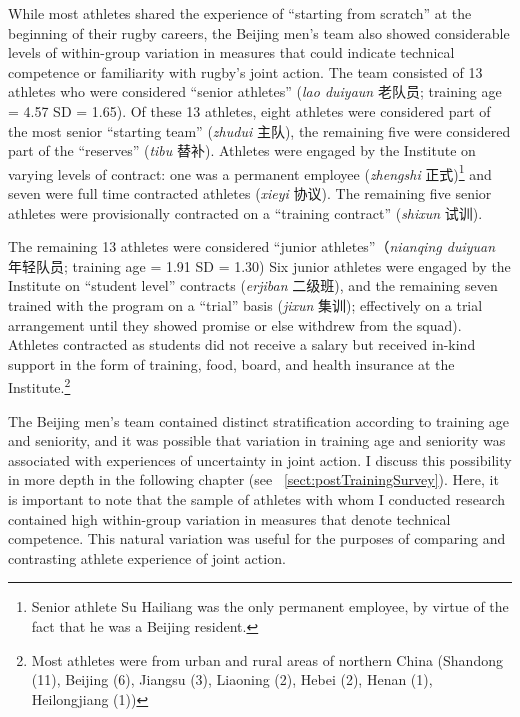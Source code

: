 \begin{CJK}{UTF8}{gbsn}
While most athletes shared the experience of ``starting from scratch'' at the beginning of their rugby careers, the Beijing men's team also showed considerable levels of within-group variation in measures that could indicate technical competence or familiarity with rugby's joint action.  The team consisted of 13 athletes who were considered ``senior athletes'' (\textit{lao duiyaun} 老队员; training age = 4.57 SD = 1.65).  Of these 13 athletes, eight athletes were considered part of the most senior ``starting team'' (\textit{zhudui} 主队), the remaining five were considered part of the ``reserves'' (\textit{tibu} 替补).  Athletes were engaged by the Institute on varying levels of contract: one was a permanent employee (\textit{zhengshi} 正式)\footnote{Senior athlete Su Hailiang was the only permanent employee, by virtue of the fact that he was a Beijing resident.} and seven were full time contracted athletes (\textit{xieyi} 协议).  The remaining five senior athletes were provisionally contracted on a ``training contract'' (\textit{shixun} 试训).

The remaining 13 athletes were considered ``junior athletes''（\textit{nianqing duiyuan} 年轻队员; training age = 1.91 SD = 1.30)
Six junior athletes were engaged by the Institute on ``student level'' contracts (\textit{erjiban} 二级班), and the remaining seven trained with the program on a ``trial'' basis (\textit{jixun} 集训); effectively on a trial arrangement until they showed promise or else withdrew from the squad).  Athletes contracted as students did not receive a salary but received in-kind support in the form of training, food, board, and health insurance at the Institute.\footnote{Most athletes were from urban and rural areas of northern China (Shandong (11), Beijing (6), Jiangsu (3), Liaoning (2), Hebei (2), Henan (1), Heilongjiang (1))}

The Beijing men's team contained distinct stratification according to training age and seniority, and it was possible that variation in training age and seniority was associated with experiences of uncertainty in joint action.  I discuss this possibility in more depth in the following chapter (see ~\ref{sect:postTrainingSurvey}).  Here, it is important to note that the sample of athletes with whom I conducted research contained high within-group variation in measures that denote technical competence.  This natural variation was useful for the purposes of comparing and contrasting athlete experience of joint action.



\end{CJK}

